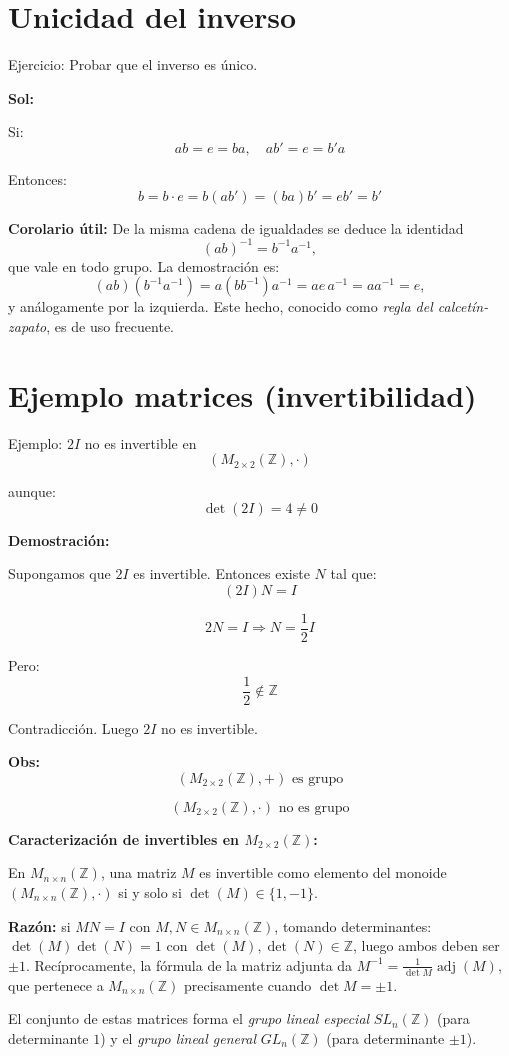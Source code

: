 \documentclass[12pt]{article}
\begin{document}
\section*{Unicidad del inverso}

Ejercicio: Probar que el inverso es único.

\textbf{Sol:}

Si:
\[
ab=e=ba, \quad ab'=e=b'a
\]

Entonces:
\[
b=b\cdot e=b(ab')=(ba)b'=e b'=b'
\]

\begin{tcolorbox}[iabox]
\textbf{Corolario útil:} De la misma cadena de igualdades se deduce la identidad
\[
  (ab)^{-1}=b^{-1}a^{-1},
\]
que vale en todo grupo. La demostración es:
\[
  (ab)(b^{-1}a^{-1}) = a(bb^{-1})a^{-1} = a e\, a^{-1} = aa^{-1} = e,
\]
y análogamente por la izquierda. Este hecho, conocido como \emph{regla del calcetín-zapato}, es de uso frecuente.
\end{tcolorbox}

\section*{Ejemplo matrices (invertibilidad)}

Ejemplo: $2I$ no es invertible en
\[
(M_{2\times2}(\mathbb{Z}),\cdot)
\]

aunque:
\[
\det(2I)=4\neq 0
\]

\textbf{Demostración:}

Supongamos que $2I$ es invertible. Entonces existe $N$ tal que:
\[
(2I)N=I
\]

\[
2N=I \Rightarrow N=\frac{1}{2}I
\]

Pero:
\[
\frac{1}{2}\notin \mathbb{Z}
\]

Contradicción. Luego $2I$ no es invertible.

\textbf{Obs:}
\[
(M_{2\times2}(\mathbb{Z}),+) \text{ es grupo}
\]

\[
(M_{2\times2}(\mathbb{Z}),\cdot) \text{ no es grupo}
\]

\begin{tcolorbox}[iabox]
\textbf{Caracterización de invertibles en $M_{2\times2}(\mathbb{Z})$:}

En $M_{n\times n}(\mathbb{Z})$, una matriz $M$ es invertible como elemento del monoide $(M_{n\times n}(\mathbb{Z}),\cdot)$ si y solo si $\det(M)\in\{1,-1\}$.

\textbf{Razón:} si $MN=I$ con $M,N\in M_{n\times n}(\mathbb{Z})$, tomando determinantes: $\det(M)\det(N)=1$ con $\det(M),\det(N)\in\mathbb{Z}$, luego ambos deben ser $\pm 1$. Recíprocamente, la fórmula de la matriz adjunta da $M^{-1}=\frac{1}{\det M}\operatorname{adj}(M)$, que pertenece a $M_{n\times n}(\mathbb{Z})$ precisamente cuando $\det M=\pm 1$.

El conjunto de estas matrices forma el \emph{grupo lineal especial} $SL_n(\mathbb{Z})$ (para determinante $1$) y el \emph{grupo lineal general} $GL_n(\mathbb{Z})$ (para determinante $\pm 1$).
\end{tcolorbox}
\end{document}
